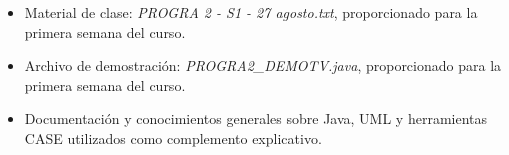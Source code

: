\documentclass[12pt,a4paper]{article}
\begin{document}
\begin{itemize}

    \item Material de clase: \textit{PROGRA 2 - S1 - 27 agosto.txt},
    proporcionado para la primera semana del curso.

    \item Archivo de demostración:
    \textit{PROGRA2\_DEMOTV.java}, proporcionado para la primera
    semana del curso.

    \item Documentación y conocimientos generales sobre Java, UML y
    herramientas CASE utilizados como complemento explicativo.

\end{itemize}
\end{document}
